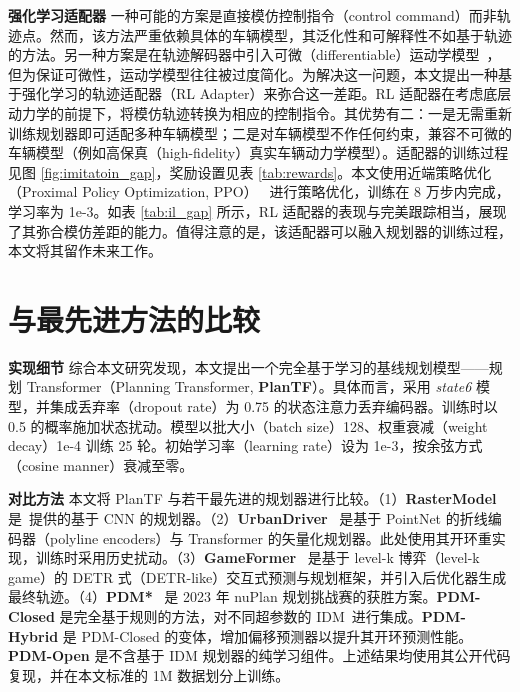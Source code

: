\documentclass[letterpaper, 10 pt, conference]{ieeeconf}  %
\renewcommand{\paragraph}[1]{\vspace{1.25mm}\noindent\textbf{#1}}
\begin{document}
\paragraph{强化学习适配器} 一种可能的方案是直接模仿控制指令（control command）而非轨迹点。然而，该方法严重依赖具体的车辆模型，其泛化性和可解释性不如基于轨迹的方法。另一种方案是在轨迹解码器中引入可微（differentiable）运动学模型~\cite{cui2020deep,zhou2021exploring}，但为保证可微性，运动学模型往往被过度简化。为解决这一问题，本文提出一种基于强化学习的轨迹适配器（RL Adapter）来弥合这一差距。RL 适配器在考虑底层动力学的前提下，将模仿轨迹转换为相应的控制指令。其优势有二：一是无需重新训练规划器即可适配多种车辆模型；二是对车辆模型不作任何约束，兼容不可微的车辆模型（例如高保真（high-fidelity）真实车辆动力学模型）。适配器的训练过程见图 \ref{fig:imitatoin_gap}，奖励设置见表 \ref{tab:rewards}。本文使用近端策略优化（Proximal Policy Optimization, PPO）~\cite{schulman2017proximal} 进行策略优化，训练在 8 万步内完成，学习率为 1e-3。如表 \ref{tab:il_gap} 所示，RL 适配器的表现与完美跟踪相当，展现了其弥合模仿差距的能力。值得注意的是，该适配器可以融入规划器的训练过程，本文将其留作未来工作。

\section{与最先进方法的比较}

\paragraph{实现细节}
综合本文研究发现，本文提出一个完全基于学习的基线规划模型——规划 Transformer（Planning Transformer, \textbf{PlanTF}）。具体而言，采用 \textit{state6} 模型，并集成丢弃率（dropout rate）为 0.75 的状态注意力丢弃编码器。训练时以 0.5 的概率施加状态扰动。模型以批大小（batch size）128、权重衰减（weight decay）1e-4 训练 25 轮。初始学习率（learning rate）设为 1e-3，按余弦方式（cosine manner）衰减至零。

\paragraph{对比方法}
本文将 PlanTF 与若干最先进的规划器进行比较。（1）\textbf{RasterModel} 是~\cite{caesar2021nuplan}提供的基于 CNN 的规划器。（2）\textbf{UrbanDriver}~\cite{scheel2022urban} 是基于 PointNet 的折线编码器（polyline encoders）与 Transformer 的矢量化规划器。此处使用其开环重实现，训练时采用历史扰动。（3）\textbf{GameFormer}~\cite{huang2023gameformer} 是基于 level-k 博弈（level-k game）的 DETR 式（DETR-like）交互式预测与规划框架，并引入后优化器生成最终轨迹。（4）\textbf{PDM*}~\cite{Dauner2023CORL} 是 2023 年 nuPlan 规划挑战赛的获胜方案。\textbf{PDM-Closed} 是完全基于规则的方法，对不同超参数的 IDM~\cite{treiber2000idm}进行集成。\textbf{PDM-Hybrid} 是 PDM-Closed 的变体，增加偏移预测器以提升其开环预测性能。\textbf{PDM-Open} 是不含基于 IDM 规划器的纯学习组件。上述结果均使用其公开代码复现，并在本文标准的 1M 数据划分上训练。
\end{document}
